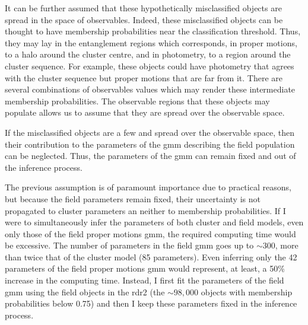 It can be further assumed that these hypothetically misclassified objects are spread in the space of observables. Indeed, these misclassified objects can be thought to have membership probabilities near the classification threshold. Thus, they may lay in the entanglement regions which corresponds, in proper motions, to a halo around the cluster centre, and in photometry, to a region around the cluster sequence. For example, these objects could have photometry that agrees with the cluster sequence but proper motions that are far from it. There are several combinations of observables values which may render these intermediate membership probabilities. The observable regions that these objects may populate allows us to assume that they are spread over the observable space. 


If the misclassified objects are a few and spread over the observable space, then their contribution to the parameters of the \gls{gmm} describing the field population can be neglected. Thus, the parameters of the \gls{gmm} can remain fixed and out of the inference process. 

The previous assumption is of paramount importance due to practical reasons, but because the field parameters remain fixed, their uncertainty is not propagated to cluster parameters an neither to membership probabilities. If I were to simultaneously infer the parameters of both cluster and field models, even only those of the field proper motions \gls{gmm}, the required computing time would be excessive. The number of parameters in the field \gls{gmm} goes up to $\sim 300$, more than twice that of the cluster model (85 parameters). {Even inferring only the 42 parameters of the field proper motions \gls{gmm} would represent, at least, a 50\% increase in the computing time}. Instead, I first fit the parameters of the field \gls{gmm} using the field objects in the \gls{rdr2} (the $\sim 98,000$ objects with membership probabilities below 0.75) and then I keep these parameters fixed in the inference process.   

